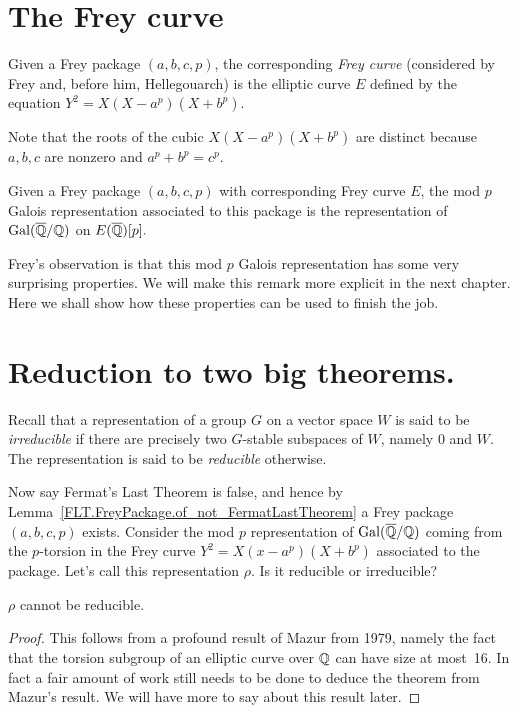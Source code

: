 \section{The Frey curve}

\begin{definition}[Frey]\label{FLT.FreyCurve}
  Given a Frey package $(a,b,c,p)$, the corresponding \emph{Frey curve} (considered by Frey and, before him, Hellegouarch) is the elliptic curve $E$ defined by the equation $Y^2=X(X-a^p)(X+b^p).$\end{definition}

Note that the roots of the cubic $X(X-a^p)(X+b^p)$ are distinct because $a,b,c$ are nonzero and $a^p+b^p=c^p$.

\begin{definition}\label{FLT.FreyCurve.mod_p_Galois_representation} Given a Frey package $(a,b,c,p)$ with corresponding Frey curve $E$, the mod $p$ Galois representation associated to this package is the representation of $\operatorname{Gal}(\overline{\mathbb{Q}}/\mathbb{Q})$ on $E(\overline{\mathbb{Q}})[p].$\end{definition}

Frey's observation is that this mod $p$ Galois representation has some very surprising properties. We will make this remark more explicit in the next chapter. Here we shall show how these properties can be used to finish the job.

\section{Reduction to two big theorems.}
  
Recall that a representation of a group $G$ on a vector space $W$ is said to be \emph{irreducible} if there are precisely two $G$-stable subspaces of $W$, namely $0$ and $W$. The representation is said to be \emph{reducible} otherwise.

Now say Fermat's Last Theorem is false, and hence by Lemma~\ref{FLT.FreyPackage.of_not_FermatLastTheorem} a Frey package $(a,b,c,p)$ exists.  Consider the mod $p$ representation of $\operatorname{Gal}(\overline{\mathbb{Q}}/\mathbb{Q})$ coming from the $p$-torsion in the Frey curve $Y^2=X(x-a^p)(X+b^p)$ associated to the package. Let's call this representation $\rho$. Is it reducible or irreducible?

\begin{theorem}[Mazur]\label{FLT.FreyCurve.Mazur_Frey}\leanok $\rho$ cannot be reducible.\end{theorem}
\begin{proof}\tangled This follows from a profound result of Mazur \cite{mazur-torsion} from 1979, namely the fact that the torsion subgroup of an elliptic curve over $\mathbb{Q}$ can have size at most~16. In fact a fair amount of work still needs to be done to deduce the theorem from Mazur's result. We will have more to say about this result later.
\end{proof}

